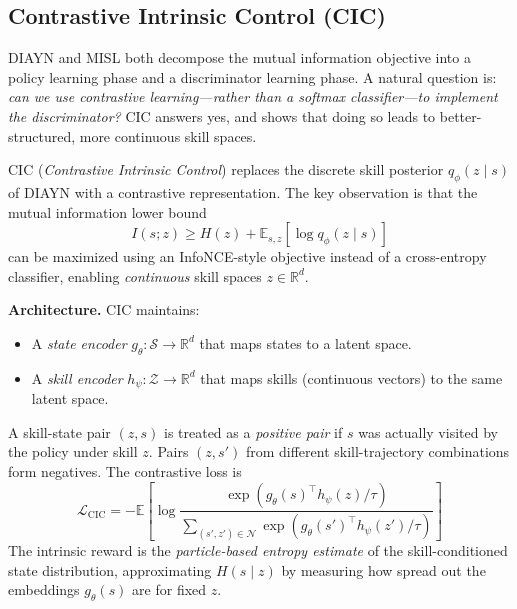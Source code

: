 \documentclass[11pt, letterpaper]{article}
\begin{document}
\subsection{Contrastive Intrinsic Control (CIC)}
 
DIAYN and MISL both decompose the mutual information objective into a policy learning phase and a discriminator learning phase. A natural question is: \textit{can we use contrastive learning---rather than a softmax classifier---to implement the discriminator?} CIC answers yes, and shows that doing so leads to better-structured, more continuous skill spaces.
 
\begin{concept}
    CIC (\textit{Contrastive Intrinsic Control}) replaces the discrete skill posterior \(q_\phi(z \mid s)\) of DIAYN with a contrastive representation. The key observation is that the mutual information lower bound
    \[
        I(s; z) \geq H(z) + \mathbb{E}_{s, z}[\log q_\phi(z \mid s)]
    \]
    can be maximized using an InfoNCE-style objective instead of a cross-entropy classifier, enabling \textit{continuous} skill spaces \(z \in \mathbb{R}^d\).
 
    \textbf{Architecture.} CIC maintains:
    \begin{itemize}
        \item A \textit{state encoder} \(g_\theta : \mathcal{S} \to \mathbb{R}^d\) that maps states to a latent space.
        \item A \textit{skill encoder} \(h_\psi : \mathcal{Z} \to \mathbb{R}^d\) that maps skills (continuous vectors) to the same latent space.
    \end{itemize}
    A skill-state pair \((z, s)\) is treated as a \textit{positive pair} if \(s\) was actually visited by the policy under skill \(z\). Pairs \((z, s')\) from different skill-trajectory combinations form negatives. The contrastive loss is
    \[
        \mathcal{L}_{\text{CIC}} = -\mathbb{E}\left[\log \frac{\exp(g_\theta(s)^\top h_\psi(z) / \tau)}{\sum_{(s', z') \in \mathcal{N}} \exp(g_\theta(s')^\top h_\psi(z') / \tau)}\right]
    \]
    The intrinsic reward is the \textit{particle-based entropy estimate} of the skill-conditioned state distribution, approximating \(H(s \mid z)\) by measuring how spread out the embeddings \(g_\theta(s)\) are for fixed \(z\).
\end{concept}
 
\end{document}
